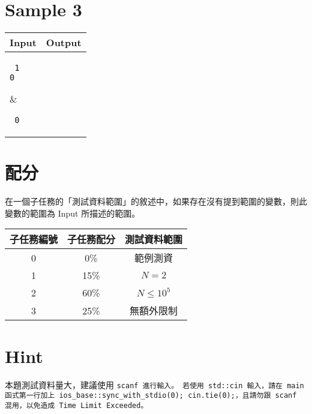 \documentclass[11pt,a4paper]{article}
\begin{document}
\newpage
\section*{Sample 3}
\begin{longtable}[!h]{|p{}|p{}|}
\hline
\textbf {Input}	& \textbf {Output} \\
\hline
\parbox[t]{0.5\textwidth} %
{ \tt
1 \\
0 \\
} &
\parbox[t]{0.5\textwidth}
{ \tt
0 \\
} \\
\hline
\end{longtable}

\section*{配分}

在一個子任務的「測試資料範圍」的敘述中，如果存在沒有提到範圍的變數，則此變數的範圍為 Input 所描述的範圍。

\begin{center}
 \begin{tabular}{||c c c||} 
 \hline
 子任務編號 & 子任務配分 & 測試資料範圍 \\  
 \hline\hline
 0 & 0\% & 範例測資 \\ 
 \hline
 1 & 15\% & $N = 2$ \\
 \hline
 2 & 60\% & $N \le 10^5$ \\
 \hline
 3 & 25\% & 無額外限制 \\
 \hline
\end{tabular}
\end{center}

\section*{Hint}
本題測試資料量大，建議使用 \tt{scanf} 進行輸入。
若使用 \tt{std::cin} 輸入，請在 \tt{main} 函式第一行加上 \tt{ios\_base::sync\_with\_stdio(0);} \tt{cin.tie(0);}，且請勿跟 \tt{scanf} 混用，以免造成 Time Limit Exceeded。
\end{document}
